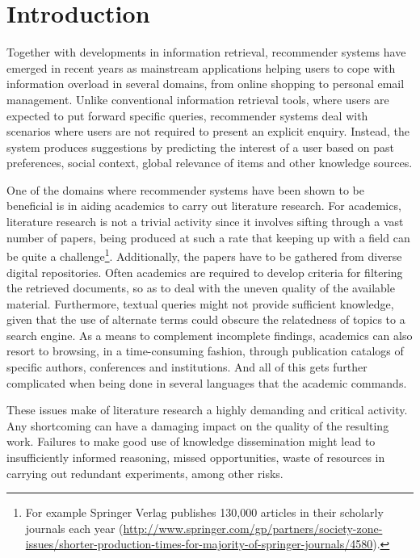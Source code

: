 \documentclass{llncs}
\begin{document}
\section{Introduction}

Together with developments in information retrieval, recommender systems have emerged in recent years as mainstream applications helping users to cope with information overload in several domains, from online shopping to personal email management. Unlike conventional information retrieval tools, where users are expected to put forward specific queries, recommender systems deal with scenarios where users are not required to present an explicit enquiry. Instead, the system produces suggestions by predicting the interest of a user based on past preferences, social context, global relevance of items and other knowledge sources. 

One of the domains where recommender systems have been shown to be beneficial is in aiding academics to carry out literature research. For academics, literature research is not a trivial activity since it involves sifting through a vast number of papers, being produced at such a rate that keeping up with a field can be quite a challenge\footnote{For example Springer Verlag publishes 130,000 articles in their scholarly journals each year (\url{http://www.springer.com/gp/partners/society-zone-issues/shorter-production-times-for-majority-of-springer-journals/4580}).}. Additionally, the papers have to be gathered from diverse digital repositories. Often academics are required to develop criteria for filtering the retrieved documents, so as to deal with the uneven quality of the available material. Furthermore, textual queries might not provide sufficient knowledge, given that the use of alternate terms could obscure the relatedness of topics to a search engine. As a means to complement incomplete findings, academics can also resort to browsing, in a time-consuming fashion, through publication catalogs of specific authors, conferences and institutions. And all of this gets further complicated when being done in several languages that the academic commands. 

These issues make of literature research a highly demanding and critical activity. Any shortcoming can have a damaging impact on the quality of the resulting work. Failures to make good use of knowledge dissemination might lead to insufficiently informed reasoning, missed opportunities, waste of resources in carrying out redundant experiments, among other risks.
\end{document}
